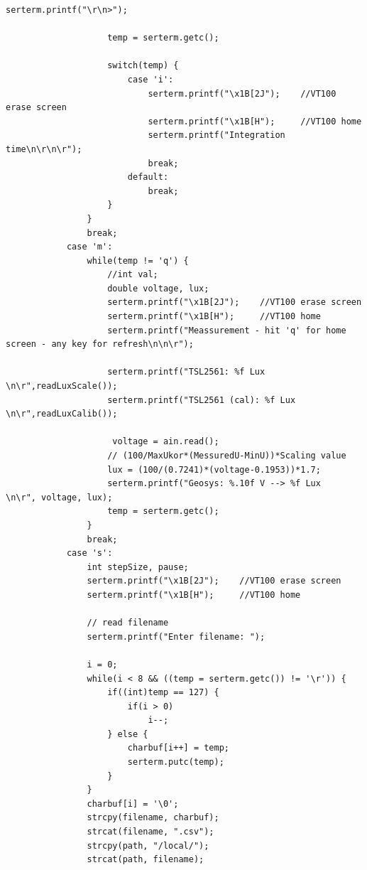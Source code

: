 \documentclass[a4paper,12pt]{scrartcl}
\begin{document}
\begin{lstlisting}[captionpos=b, caption=MBED-Programmcode für den Messaufbau, label=messprogkomplett]
                    serterm.printf("\r\n>");

                    temp = serterm.getc();

                    switch(temp) {
                        case 'i':
                            serterm.printf("\x1B[2J");    //VT100 erase screen
                            serterm.printf("\x1B[H");     //VT100 home
                            serterm.printf("Integration time\n\r\n\r");
                            break;
                        default:
                            break;
                    }
                }
                break;
            case 'm':
                while(temp != 'q') {
                    //int val;
                    double voltage, lux;
                    serterm.printf("\x1B[2J");    //VT100 erase screen
                    serterm.printf("\x1B[H");     //VT100 home
                    serterm.printf("Meassurement - hit 'q' for home screen - any key for refresh\n\n\r");

                    serterm.printf("TSL2561: %f Lux            \n\r",readLuxScale());
                    serterm.printf("TSL2561 (cal): %f Lux            \n\r",readLuxCalib());

					 voltage = ain.read();
                    // (100/MaxUkor*(MessuredU-MinU))*Scaling value
                    lux = (100/(0.7241)*(voltage-0.1953))*1.7;
                    serterm.printf("Geosys: %.10f V --> %f Lux             \n\r", voltage, lux);
                    temp = serterm.getc();
                }
                break;
            case 's':
                int stepSize, pause;
                serterm.printf("\x1B[2J");    //VT100 erase screen
                serterm.printf("\x1B[H");     //VT100 home

                // read filename
                serterm.printf("Enter filename: ");

                i = 0;
                while(i < 8 && ((temp = serterm.getc()) != '\r')) {
                    if((int)temp == 127) {
                        if(i > 0)
                            i--;
                    } else {
                        charbuf[i++] = temp;
                        serterm.putc(temp);
                    }
                }
                charbuf[i] = '\0';
                strcpy(filename, charbuf);
                strcat(filename, ".csv");
                strcpy(path, "/local/");
                strcat(path, filename);


\end{lstlisting}
\end{document}
